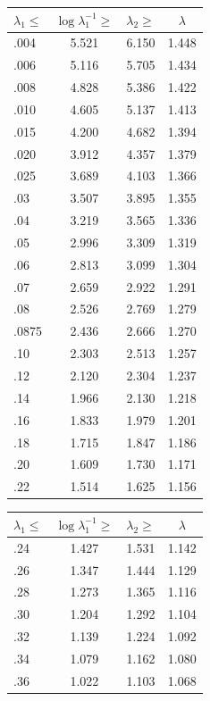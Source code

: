 \documentclass[12pt,psamsfonts]{amsart}
\theoremstyle{definition}
\theoremstyle{remark}
\numberwithin{equation}{section}
\begin{document}
\begin{table}
\begin{tabular}{l|c|c|c} 
$\lambda_1 \leq$ & $\log \lambda_1^{-1} \geq$ & $\lambda_2 \geq$  & $\lambda$ \\
 \hline 
 .004 &  5.521 &  6.150 &  1.448 \\ 
 .006 &  5.116 &  5.705 &  1.434 \\ 
 .008 &  4.828 &  5.386 &  1.422 \\ 
 .010 &  4.605 &  5.137 &  1.413 \\ 
 .015 &  4.200 &  4.682 &  1.394 \\ 
 .020 &  3.912 &  4.357 &  1.379 \\ 
 .025 &  3.689 &  4.103 &  1.366 \\ 
 .03 &  3.507 &  3.895 &  1.355 \\ 
 .04 &  3.219 &  3.565 &  1.336 \\ 
 .05 &  2.996 &  3.309 &  1.319 \\ 
 .06 &  2.813 &  3.099 &  1.304 \\ 
 .07 &  2.659 &  2.922 &  1.291 \\ 
 .08 &  2.526 &  2.769 &  1.279 \\ 
 .0875 &  2.436 &  2.666 &  1.270 \\ 
 .10 &  2.303 &  2.513 &  1.257 \\ 
 .12 &  2.120 &  2.304 &  1.237 \\ 
 .14 &  1.966 &  2.130 &  1.218 \\ 
 .16 &  1.833 &  1.979 &  1.201 \\ 
 .18 &  1.715 &  1.847 &  1.186 \\ 
  .20 &  1.609 &  1.730 &  1.171 \\ 
 .22 &  1.514 &  1.625 &  1.156 \\ 
 \end{tabular}
 \qquad
 \begin{tabular}{l|c|c|c} 
$\lambda_1 \leq$ & $\log \lambda_1^{-1} \geq$ & $\lambda_2 \geq$  & $\lambda$ \\
 \hline 
  .24 &  1.427 &  1.531 &  1.142 \\ 
 .26 &  1.347 &  1.444 &  1.129 \\ 
 .28 &  1.273 &  1.365 &  1.116 \\ 
 .30 &  1.204 &  1.292 &  1.104 \\ 
 .32 &  1.139 &  1.224 &  1.092 \\ 
 .34 &  1.079 &  1.162 &  1.080 \\ 
 .36 &  1.022 &  1.103 &  1.068 \\ 

\end{tabular}
\end{table}
\end{document}
